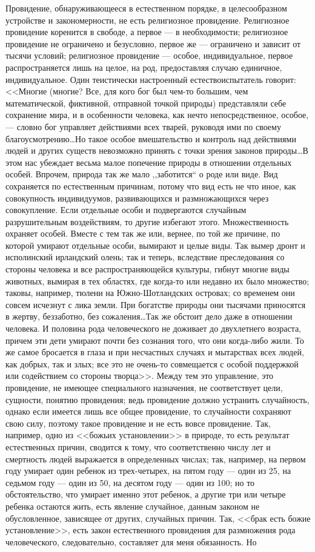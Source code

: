 \documentclass[12pt,oneside]{book}
\begin{document}
Провидение, обнаруживающееся в естественном порядке, в целесообразном устройстве и закономерности, не есть религиозное провидение. Религиозное провидение коренится в свободе, а первое --- в необходимости; религиозное провидение не ограничено и безусловно, первое же --- ограничено и зависит от тысячи условий; религиозное провидение --- особое, индивидуальное, первое распространяется лишь на целое, на род, предоставляя случаю единичное, индивидуальное. Один теистически настроенный естествоиспытатель говорит: <<Многие (многие? Все, для кого бог был чем-то большим, чем математической, фиктивной, отправной точкой природы) представляли себе сохранение мира, и в особенности человека, как нечто непосредственное, особое, --- словно бог управляет действиями всех тварей, руководя ими по своему благоусмотрению\dots Но такое особое вмешательство и контроль над действиями людей и других существ невозможно принять с точки зрения законов природы\dots В этом нас убеждает весьма малое попечение природы в отношении отдельных особей. Впрочем, природа так же мало ,,заботится`` о роде или виде. Вид сохраняется по естественным причинам, потому что вид есть не что иное, как совокупность индивидуумов, развивающихся и размножающихся через совокупление. Если отдельные особи и подвергаются случайным разрушительным воздействиям, то другие избегают этого. Множественность охраняет особей. Вместе с тем так же или, вернее, по той же причине, по которой умирают отдельные особи, вымирают и целые виды. Так вымер дронт и исполинский ирландский олень; так и теперь, вследствие преследования со стороны человека и все распространяющейся культуры, гибнут многие виды животных, вымирая в тех областях, где когда-то или недавно их было множество; таковы, например, тюлени на Южно-Шотландских островах; со временем они совсем исчезнут с лика земли. При богатстве природы они тысячами приносятся в жертву, беззаботно, без сожаления\dots Так же обстоит дело даже в отношении человека. И половина рода человеческого не доживает до двухлетнего возраста, причем эти дети умирают почти без сознания того, что они когда-либо жили. То же самое бросается в глаза и при несчастных случаях и мытарствах всех людей, как добрых, так и злых; все это не очень-то совмещается с особой поддержкой или содействием со стороны творца>>. Между тем это управление, это провидение, не имеющее специального назначения, не соответствует цели, сущности, понятию провидения; ведь провидение должно устранить случайность, однако если имеется лишь все общее провидение, то случайности сохраняют свою силу, поэтому такое провидение и не есть вовсе провидение. Так, например, одно из <<божьих установлении>> в природе, то есть результат естественных причин, сводится к тому, что соответственно числу лет и смертность людей выражается в определенных числах; так, например, на первом году умирает один ребенок из трех-четырех, на пятом году --- один из 25, на седьмом году --- один из 50, на десятом году --- один из 100; но то обстоятельство, что умирает именно этот ребенок, а другие три или четыре ребенка остаются жить, есть явление случайное, данным законом не обусловленное, зависящее от других, случайных причин. Так, <<брак есть божие установление>>, есть закон естественного провидения для размножения рода человеческого, следовательно, составляет для меня обязанность. Но 
\end{document}
